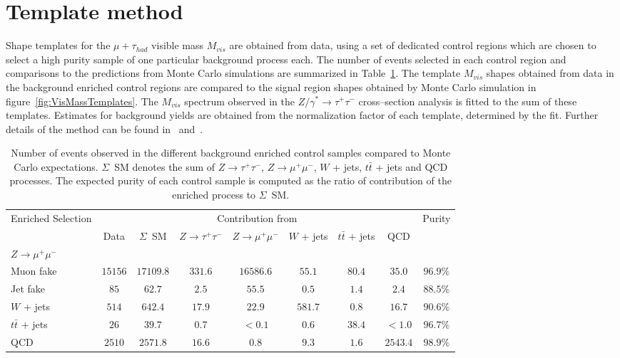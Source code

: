 \section{Template method}
\label{sec:template}

Shape templates for the $\mu + \tau_{had}$ visible mass $M_{vis}$ are obtained
from data, using a set of dedicated control regions which are chosen to select a
high purity sample of one particular background process each.  The number of
events selected in each control region and comparisons to the predictions from
Monte Carlo simulations are summarized in
Table~\ref{tab:ResultsMuTauBgControlRegions}.  The template $M_{vis}$ shapes
obtained from data in the background enriched control regions are compared to
the signal region shapes obtained by Monte Carlo simulation in
figure~\ref{fig:VisMassTemplates}.  The $M_{vis}$ spectrum observed in the
$Z/\gamma^{*} \rightarrow \tau^{+} \tau^{-}$ cross--section analysis is fitted
to the sum of these templates.  Estimates for background yields are obtained
from the normalization factor of each template, determined by the fit.  Further
details of the method can be found in~\cite{CMS_AN_2010-088}
and~\cite{CMS_AN_2011-021}. 

\begin{table}[t]
\begin{center}
\tablesize
\begin{tabular}{|l|c|c|c|c|c|c|c|c|}
\hline
\multirow{2}{17mm}{Enriched Selection} & \multicolumn{7}{c|}{Contribution from} & \multirow{2}{12mm}{Purity} \\
 & Data & $\Sigma$~SM & $Z \to \tau^{+} \tau^{-}$ & $Z \to \mu^{+} \mu^{-}$ & $W$ + jets & $t\bar{t}$ + jets & QCD & \\
\hline
\hline
$Z \to \mu^{+} \mu^{-}$ & & & & & & & & \\
\hspace{2mm} Muon fake & $15156$ & $17109.8$ & $331.6$ & $16586.6$ & $55.1$ & $80.4$ & $35.0$ & $96.9\%$ \\
\hspace{2mm} Jet fake & $85$ & $62.7$ & $2.5$ & $55.5$ & $0.5$ & $1.4$ & $2.4$ & $88.5\%$ \\
$W$ + jets & $514$ & $642.4$ & $17.9$ & $22.9$ & $581.7$ & $0.8$ & $16.7$ & $90.6\%$ \\  
$t\bar{t}$ + jets & $26$ & $39.7$ & $0.7$ & $< 0.1$ & $0.6$ & $38.4$ & $< 1.0$ & $96.7\%$ \\
QCD & $2510$ & $2571.8$ & $16.6$ & $0.8$ & $9.3$ & $1.6$ & $2543.4$ & $98.9\%$ \\
\hline
\end{tabular}
\caption{\captiontext 
         Number of events observed in the different background enriched control
         samples compared to Monte Carlo expectations.  $\Sigma$~SM denotes the
         sum of $Z \to \tau^{+} \tau^{-}$, $Z \to \mu^{+} \mu^{-}$, $W$ + jets,
         $t\bar{t}$ + jets and QCD processes.  The expected purity of each
         control sample is computed as the ratio of contribution of the enriched
         process to $\Sigma$~SM.}
\label{tab:ResultsMuTauBgControlRegions}
\end{center}
\end{table}

